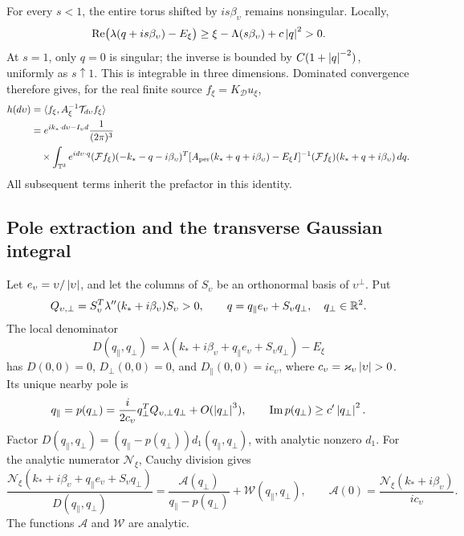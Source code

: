 For every \(s<1\), the entire torus shifted by \(is\beta_\upsilon\) remains
nonsingular. Locally,
\[
 \operatorname{Re}\bigl(\lambda(q+is\beta_\upsilon)-E_\xi\bigr)
 \ge\xi-\Lambda(s\beta_\upsilon)+c\left\lvert q\right\rvert^2>0.
\]
At \(s=1\), only \(q=0\) is singular; the inverse is bounded by
\(C(1+\left\lvert q\right\rvert^{-2})\), uniformly as \(s\uparrow1\).
This is integrable in three dimensions. Dominated convergence therefore
gives, for the real finite source \(f_\xi=K_{\mathcal D}u_\xi\),
\begin{align}
 h(d\upsilon)
 &=\langle f_\xi,A_\xi^{-1}\mathcal T_{d\upsilon}f_\xi\rangle \nonumber\\
 &=e^{ik_*\cdot d\upsilon-I_\upsilon d}
   \frac1{(2\pi)^3}\nonumber\\
 &\quad{}\times\int_{\mathbb T^3}e^{id\upsilon\cdot q}
   (\mathcal Ff_\xi)(-k_*-q-i\beta_\upsilon)^T
   [A_{\rm per}(k_*+q+i\beta_\upsilon)-E_\xi I]^{-1}
   (\mathcal Ff_\xi)(k_*+q+i\beta_\upsilon)\,dq .
 \label{d:eq:appendix-boundary-contour}
\end{align}
All subsequent terms inherit the prefactor in this identity.

\subsection{Pole extraction and the transverse Gaussian integral}

Let \(e_\upsilon=\upsilon/\left\lvert \upsilon\right\rvert\), and let the columns of \(S_\upsilon\) be an orthonormal
basis of \(\upsilon^\perp\). Put
\[
 Q_{\upsilon,\perp}=S_\upsilon^T\lambda''(k_*+i\beta_\upsilon)S_\upsilon>0,\qquad
 q=q_\parallel e_\upsilon+S_\upsilon q_\perp,\quad q_\perp\in\mathbb R^2.
\]
The local denominator
\[
 D(q_\parallel,q_\perp)=\lambda(k_*+i\beta_\upsilon+q_\parallel e_\upsilon+S_\upsilon q_\perp)-E_\xi
\]
has \(D(0,0)=0\), \(D_\perp(0,0)=0\), and
\(D_\parallel(0,0)=ic_\upsilon\), where \(c_\upsilon=\varkappa_\upsilon\left\lvert \upsilon\right\rvert>0\).
Its unique nearby pole is
\begin{equation}
 q_\parallel=p(q_\perp)=\frac{i}{2c_\upsilon}q_\perp^TQ_{\upsilon,\perp}q_\perp+O(\left\lvert q_\perp\right\rvert^3),
 \qquad \operatorname{Im}p(q_\perp)\ge c'\left\lvert q_\perp\right\rvert^2.
 \label{d:eq:appendix-local-pole}
\end{equation}
Factor \(D(q_\parallel,q_\perp)=(q_\parallel-p(q_\perp))d_1(q_\parallel,q_\perp)\), with analytic nonzero \(d_1\).
For the analytic numerator \(\mathcal N_\xi\),
Cauchy division gives
\[
 \frac{\mathcal N_\xi(k_*+i\beta_\upsilon+q_\parallel e_\upsilon+S_\upsilon q_\perp)}{D(q_\parallel,q_\perp)}
 =\frac{\mathcal A(q_\perp)}{q_\parallel-p(q_\perp)}+\mathcal W(q_\parallel,q_\perp),\qquad
 \mathcal A(0)=\frac{\mathcal N_\xi(k_*+i\beta_\upsilon)}{ic_\upsilon}.
\]
The functions \(\mathcal A\) and \(\mathcal W\) are analytic.

